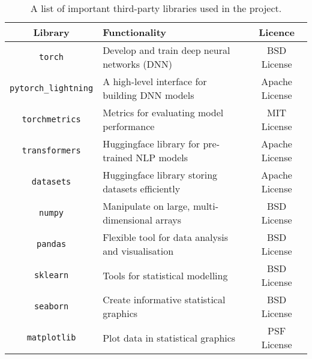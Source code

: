 \begin{table}[!ht]
    \centering
    \begin{tabular}{c|p{8.5cm}|c}
        \toprule
        \textbf{Library} & \textbf{Functionality} & \textbf{Licence} \\
        \midrule
        \texttt{torch} \cite{Paszke19PyTorch} & Develop and train deep neural networks (DNN) & BSD License \\
        \texttt{pytorch\_lightning} \cite{Falcon19PL} & A high-level interface for building DNN models & Apache License \\
        \texttt{torchmetrics} \cite{Detlefsen22torchmetrics} & Metrics for evaluating model performance & MIT License \\
        \texttt{transformers} \cite{Wolf19hugtransf} & Huggingface library for pre-trained NLP models & Apache License \\
        \texttt{datasets} \cite{lhoest21datasets} & Huggingface library storing datasets efficiently & Apache License\\
        \texttt{numpy} \cite{Harris20NumPy} & Manipulate on large, multi-dimensional arrays & BSD License\\
        \texttt{pandas} \cite{mckinney10Pandas} & Flexible tool for data analysis and visualisation & BSD License\\
        \texttt{sklearn} \cite{pedregosa11scikit} & Tools for statistical modelling & BSD License \\
        \texttt{seaborn} \cite{michael17SEABORN} & Create informative statistical graphics & BSD License\\
        \texttt{matplotlib} \cite{Hunter07Matplotlib} & Plot data in statistical graphics & PSF License\\
         \toprule
    \end{tabular}
    \caption{A list of important third-party libraries used in the project.}
    \label{tab:library}
\end{table}